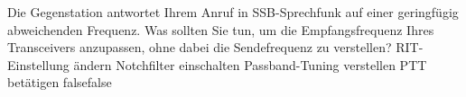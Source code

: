     {Die Gegenstation antwortet Ihrem Anruf in SSB-Sprechfunk auf einer geringfügig abweichenden Frequenz. Was sollten Sie tun, um die Empfangsfrequenz Ihres Transceivers anzupassen, ohne dabei die Sendefrequenz zu verstellen?}
    {RIT-Einstellung ändern}
    {Notchfilter einschalten}
    {Passband-Tuning verstellen}
    {PTT betätigen}
    {false}{false}
